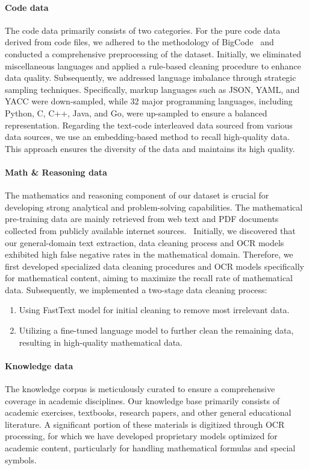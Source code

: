 \documentclass{article}
\newcommand{\citep}[1]{\parencite{#1}}
\begin{document}
\paragraph{Code data} The code data primarily consists of two categories. For the pure code data derived from code files, we adhered to the methodology of BigCode~\citep{li2023starcodersourceyou,lozhkov2024starcoder2stackv2} and conducted a comprehensive preprocessing of the dataset. Initially, we eliminated miscellaneous languages and applied a rule-based cleaning procedure to enhance data quality. Subsequently, we addressed language imbalance through strategic sampling techniques. Specifically, markup languages such as JSON, YAML, and YACC were down-sampled, while 32 major programming languages, including Python, C, C++, Java, and Go, were up-sampled to ensure a balanced representation. Regarding the text-code interleaved data sourced from various data sources, we use an embedding-based method to recall high-quality data. This approach ensures the diversity of the data and maintains its high quality.

\paragraph{Math \& Reasoning data} The mathematics and reasoning component of our dataset is crucial for developing strong analytical and problem-solving capabilities. 
The mathematical pre-training data are mainly retrieved from web text and PDF documents collected from publicly available internet sources.~\citep{paster2023openwebmath}
Initially, we discovered that our general-domain text extraction, data cleaning process and OCR models exhibited high false negative rates in the mathematical domain. Therefore, we first developed specialized data cleaning procedures and OCR models specifically for mathematical content, aiming to maximize the recall rate of mathematical data.
Subsequently, we implemented a two-stage data cleaning process: 
\begin{enumerate}
    \item Using FastText model for initial cleaning to remove most irrelevant data.
    \item Utilizing a fine-tuned language model to further clean the remaining data, resulting in high-quality mathematical data.
\end{enumerate}

\paragraph{Knowledge data} The knowledge corpus is meticulously curated to ensure a comprehensive coverage in academic disciplines. Our knowledge base primarily consists of academic exercises, textbooks, research papers, and other general educational literature. A significant portion of these materials is digitized through OCR processing, for which we have developed proprietary models optimized for academic content, particularly for handling mathematical formulas and special symbols.
\end{document}
